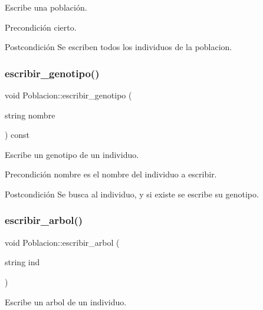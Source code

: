 Escribe una población. 

\begin{DoxyPrecond}{Precondición}
cierto. 
\end{DoxyPrecond}
\begin{DoxyPostcond}{Postcondición}
Se escriben todos los individuos de la poblacion. 
\end{DoxyPostcond}
\mbox{\label{class_poblacion_a1f86f933c6bf832f8c5b836477f8cbe9}} 
\subsubsection{\texorpdfstring{escribir\+\_\+genotipo()}{escribir\_genotipo()}}
{\footnotesize\ttfamily void Poblacion\+::escribir\+\_\+genotipo (\begin{DoxyParamCaption}\item[{string}]{nombre }\end{DoxyParamCaption}) const}



Escribe un genotipo de un individuo. 

\begin{DoxyPrecond}{Precondición}
nombre es el nombre del individuo a escribir.
\end{DoxyPrecond}
\begin{DoxyPostcond}{Postcondición}
Se busca al individuo, y si existe se escribe su genotipo. 
\end{DoxyPostcond}
\mbox{\label{class_poblacion_a44518707081153d520d7781ea7691b19}} 
\subsubsection{\texorpdfstring{escribir\+\_\+arbol()}{escribir\_arbol()}}
{\footnotesize\ttfamily void Poblacion\+::escribir\+\_\+arbol (\begin{DoxyParamCaption}\item[{string}]{ind }\end{DoxyParamCaption})}



Escribe un arbol de un individuo. 


